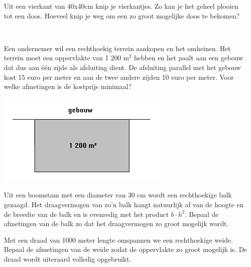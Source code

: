 \documentclass[a4paper,12pt,twoside]{article}
\begin{document}
\begin{oefening}
  Uit een vierkant van 40x40cm knip je vierkantjes. Zo kan je het geheel plooien tot een doos. Hoeveel knip je weg om een zo groot mogelijke doos te bekomen?
\end{oefening}

\begin{oefening}\\
  \begin{minipage}{0.6\textwidth}
    Een ondernemer wil een rechthoekig terrein aankopen en het omheinen. Het terrein moet een oppervlakte van 1 200 m$^2$ hebben en het paalt aan een gebouw dat dus aan één zijde als afsluiting dient. De afsluiting parallel met het gebouw kost 15 euro per meter en aan de twee andere zijden 10 euro per meter. Voor welke afmetingen is de kostprijs minimaal?
  \end{minipage}
  \begin{minipage}{0.4\textwidth}
    \centering
    \includegraphics[width=\textwidth]{terrein-omheinen}
  \end{minipage}
\end{oefening}

\begin{oefening}
  Uit een boomstam met een diameter van 30 cm wordt een rechthoekige balk gezaagd. Het draagvermogen van zo'n balk hangt natuurlijk af van de hoogte en de breedte van de balk en is evenredig met het product $b\cdot h^2$. Bepaal de afmetingen van de balk zo dat het draagvermogen zo groot mogelijk wordt.
\end{oefening}

\begin{oefening}
  Met een draad van 1000 meter lengte omspannen we een rechthoekige weide. Bepaal de afmetingen van de weide zodat de oppervlakte zo groot mogelijk is. De draad wordt uiteraard volledig opgebruikt.
\end{oefening}
\end{document}
